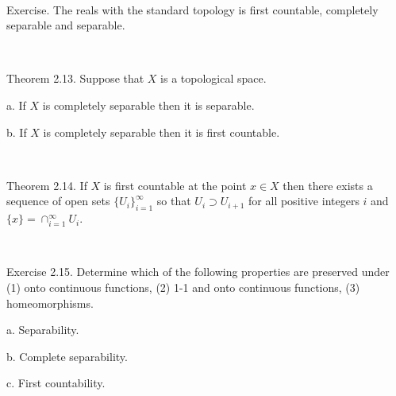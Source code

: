 \documentclass[12pt, std]{article}
\begin{document}
\

Exercise.  The reals with the standard topology is first countable,
completely separable and separable.

\

Theorem 2.13.  Suppose that $X$ is a topological space.

\qquad a.  If $X$ is completely separable then it is separable.

\qquad b.  If $X$ is completely separable then it is first
countable.

\

Theorem 2.14.  If $X$ is first countable at the point $x \in X$ then
there exists a sequence of open sets $ \{U_i \}_{i=1}^{\infty}$ so
that $U_i \supset U_{i+1}$ for all positive integers $i$ and $ \{x\}
= \cap_{i=1}^{\infty} U_i $.

\

Exercise 2.15.  Determine which of the following properties are
preserved under (1) onto continuous functions, (2) 1-1 and onto
continuous functions, (3) homeomorphisms.

\qquad a.  Separability.

\qquad b.  Complete separability.

\qquad c.  First countability.
\end{document}
